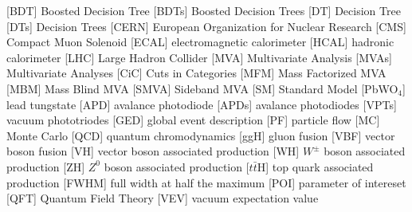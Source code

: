 \begin{acronym}[AAAAAA]
 [BDT] {Boosted Decision Tree}
 [BDTs] {Boosted Decision Trees}
 [DT] {Decision Tree}
 [DTs] {Decision Trees}
 [CERN] {European Organization for Nuclear Research}
 [CMS] {Compact Muon Solenoid}
 [ECAL] {electromagnetic calorimeter}
 [HCAL] {hadronic calorimeter}
 [LHC] {Large Hadron Collider}
 [MVA] {Multivariate Analysis}
 [MVAs] {Multivariate Analyses}
 [CiC] {Cuts in Categories}
 [MFM] {Mass Factorized MVA}
 [MBM] {Mass Blind MVA}
 [SMVA] {Sideband MVA}
 [SM] {Standard Model}
 [PbWO$_{4}$] {lead tungstate}
 [APD] {avalance photodiode}
 [APDs] {avalance photodiodes}
 [VPTs] {vacuum phototriodes}
 [GED] {global event description}
 [PF] {particle flow}
 [MC] {Monte Carlo}
 [QCD] {quantum chromodynamics}
 [ggH] {gluon fusion}
 [VBF] {vector boson fusion}
 [VH] {vector boson associated production}
 [WH] {$W^{\pm}$ boson associated production}
 [ZH] {$Z^{0}$ boson associated production}
 [$t\bar{t}$H] {top quark associated production}
 [FWHM] {full width at half the maximum}
 [POI] {parameter of intereset}
 [QFT] {Quantum Field Theory}
 [VEV] {vacuum expectation value}
\end{acronym}



